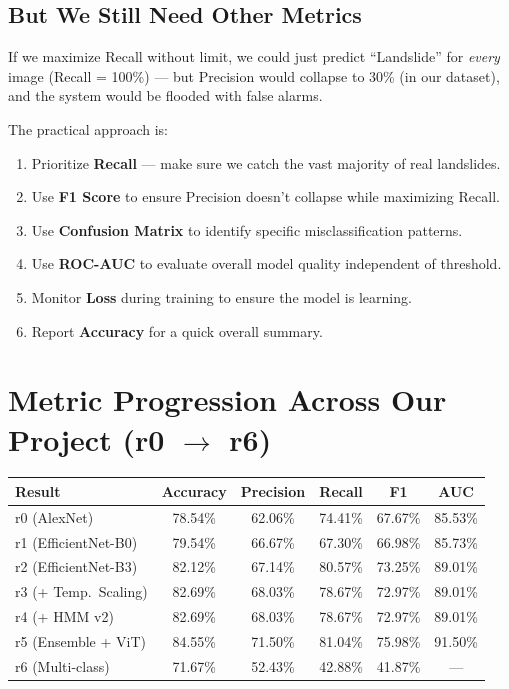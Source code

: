 \documentclass[11pt]{article}
\begin{document}
\subsection{But We Still Need Other Metrics}

If we maximize Recall without limit, we could just predict ``Landslide'' for \emph{every} image (Recall = 100\%) --- but Precision would collapse to 30\% (in our dataset), and the system would be flooded with false alarms.

\medskip
\noindent The practical approach is:
\begin{enumerate}[noitemsep]
    \item Prioritize \textbf{Recall} --- make sure we catch the vast majority of real landslides.
    \item Use \textbf{F1 Score} to ensure Precision doesn't collapse while maximizing Recall.
    \item Use \textbf{Confusion Matrix} to identify specific misclassification patterns.
    \item Use \textbf{ROC-AUC} to evaluate overall model quality independent of threshold.
    \item Monitor \textbf{Loss} during training to ensure the model is learning.
    \item Report \textbf{Accuracy} for a quick overall summary.
\end{enumerate}

\section{Metric Progression Across Our Project (r0 $\to$ r6)}

\begin{center}
\small
\renewcommand{\arraystretch}{1.2}
\begin{tabular}{lccccc}
\toprule
\textbf{Result} & \textbf{Accuracy} & \textbf{Precision} & \textbf{Recall} & \textbf{F1} & \textbf{AUC} \\
\midrule
r0 (AlexNet)           & 78.54\% & 62.06\% & 74.41\% & 67.67\% & 85.53\% \\
r1 (EfficientNet-B0)   & 79.54\% & 66.67\% & 67.30\% & 66.98\% & 85.73\% \\
r2 (EfficientNet-B3)   & 82.12\% & 67.14\% & 80.57\% & 73.25\% & 89.01\% \\
r3 (+ Temp.\ Scaling)  & 82.69\% & 68.03\% & 78.67\% & 72.97\% & 89.01\% \\
r4 (+ HMM v2)          & 82.69\% & 68.03\% & 78.67\% & 72.97\% & 89.01\% \\
r5 (Ensemble + ViT)    & 84.55\% & 71.50\% & 81.04\% & 75.98\% & 91.50\% \\
r6 (Multi-class)       & 71.67\% & 52.43\% & 42.88\% & 41.87\% & --- \\
\bottomrule
\end{tabular}
\end{center}
\end{document}
